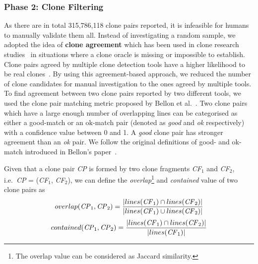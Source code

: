 \documentclass[sigconf,review, anonymous]{acmart}
\newcommand{\squeezeup}{\vspace{-0.5mm}}
\begin{document}
\subsubsection{Phase 2: Clone Filtering}
As there are in total 315,786,118 clone pairs reported, it is
infeasible for humans to manually validate them all. Instead of
investigating a random sample, we adopted the idea of \textbf{clone
  agreement} which has been used in clone research
studies~\cite{Funaro2010, Wang2013,cr2016ssbse} in situations where a
clone oracle is missing or impossible to establish. Clone pairs agreed
by multiple clone detection tools have a higher likelihood to be real
clones~\cite{cr2016ssbse}. By using this agreement-based approach, we
reduced the number of clone candidates for manual investigation to the
ones agreed by multiple tools. To find agreement between two clone
pairs reported by two different tools, we used the clone pair matching
metric proposed by Bellon et al.~\cite{Bellon2007}. Two clone pairs
which have a large enough number of overlapping lines can be
categorised as either a good-match or an ok-match pair (denoted as
\textit{good} and \textit{ok} respectively) with a confidence value
between 0 and 1. A \textit{good} clone pair has stronger agreement
than an \textit{ok} pair. We follow the original definitions of good-
and ok-match introduced in Bellon's paper~\cite{Bellon2007}.

Given that a clone pair \textit{CP} is formed by two clone fragments
\textit{CF$_1$} and \textit{CF$_2$}, i.e.~\textit{CP} = (\textit{CF$_1$},
\textit{CF$_2$}), we can define the \textit{overlap}\footnote{The overlap value can be considered as Jaccard similarity.} and
\textit{contained} value of two clone pairs as
\begin{displaymath}
  overlap(\textrm{\textit{CP}}_1, \textrm{\textit{CP}}_2) = \frac{|lines(\textrm{\textit{CF}}_1) \cap lines(\textrm{\textit{CF}}_2)|}{|lines(\textrm{\textit{CF}}_1) \cup lines(\textrm{\textit{CF}}_2)|} 
\end{displaymath}
\begin{displaymath}
  contained(\textrm{\textit{CP}}_1, \textrm{\textit{CP}}_2) = \frac{|lines(\textrm{\textit{CF}}_1) \cap lines(\textrm{\textit{CF}}_2)|}{|lines(\textrm{\textit{CF}}_1)|}
\end{displaymath}
      
\end{document}
